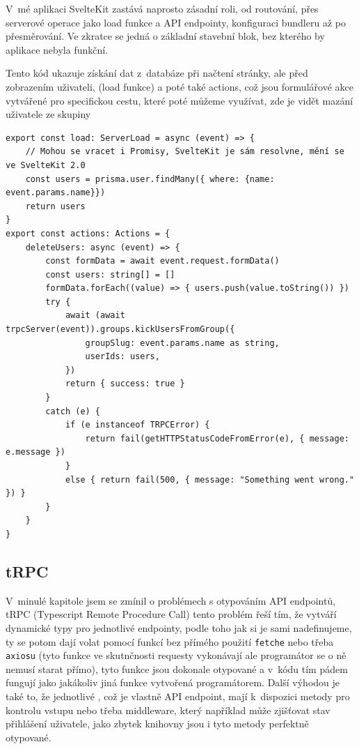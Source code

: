 \documentclass[12pt, a4paper,
openright
]{report}
\begin{document}
V~mé aplikaci SvelteKit zastává naprosto zásadní roli, od routování, přes serverové operace jako load funkce a API endpointy, konfiguraci bundleru až po přesměrování. Ve zkratce se jedná o základní stavební blok, bez kterého by aplikace nebyla funkční.

Tento kód ukazuje získání dat z~databáze při načtení stránky, ale před zobrazením uživateli, (load funkce) a poté také actions, což jsou formulářové akce vytvářené pro specifickou cestu, které poté můžeme využívat, zde je vidět mazání uživatele ze skupiny
\clearpage
\begin{lstlisting}[style=ES6, caption=Ukázka z +page.server.ts, label=sveltekit_code]
export const load: ServerLoad = async (event) => {
	// Mohou se vracet i Promisy, SvelteKit je sám resolvne, mění se ve SvelteKit 2.0
	const users = prisma.user.findMany({ where: {name: event.params.name}})
	return users
}
export const actions: Actions = {
	deleteUsers: async (event) => {
		const formData = await event.request.formData()
		const users: string[] = []
		formData.forEach((value) => { users.push(value.toString()) })
		try {
			await (await trpcServer(event)).groups.kickUsersFromGroup({
				groupSlug: event.params.name as string,
				userIds: users,
			})
			return { success: true }
		}
		catch (e) {
			if (e instanceof TRPCError) {
				return fail(getHTTPStatusCodeFromError(e), { message: e.message })
			}
			else { return fail(500, { message: "Something went wrong." }) }
		}
	}
}
\end{lstlisting}

\subsection{tRPC}
V~minulé kapitole jsem se zmínil o problémech s otypováním API endpointů, tRPC (Typescript Remote Procedure Call) tento problém řeší tím, že vytváří dynamické typy pro jednotlivé endpointy, podle toho jak si je sami nadefinujeme, ty se potom dají volat pomocí funkcí bez přímého použití \texttt{fetche} nebo třeba \texttt{axiosu} (tyto funkce ve skutnčnosti  requesty vykonávají ale programátor se o ně nemusí starat přímo), tyto funkce jsou dokonale otypované a v~kódu tím pádem fungují jako jakákoliv jiná funkce vytvořená programátorem. Další výhodou je také to, že jednotlivé , což je vlastně API endpoint, mají k~dispozici metody pro kontrolu vstupu nebo třeba middleware, který například může zjišťovat stav přihlášení uživatele, jako zbytek knihovny jsou i tyto metody perfektně otypované.
\end{document}
